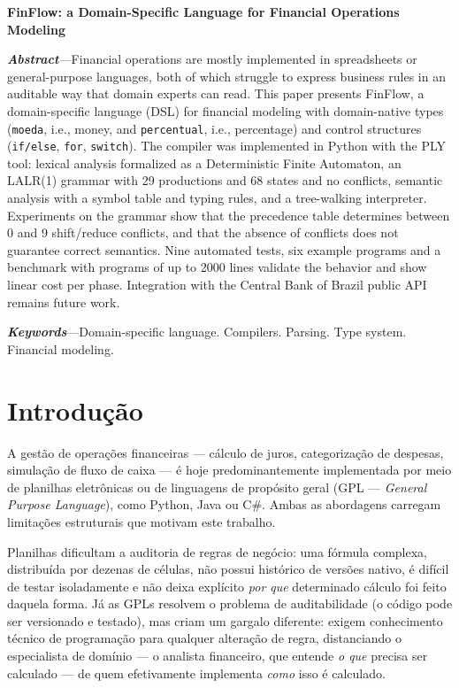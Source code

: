 \documentclass[conference]{IEEEtran}
\begin{document}
\begingroup\footnotesize\noindent\textbf{FinFlow: a Domain-Specific Language for Financial Operations Modeling}\par\smallskip
\noindent\textit{\textbf{Abstract}---}Financial operations are mostly implemented in spreadsheets or general-purpose languages, both of which struggle to express business rules in an auditable way that domain experts can read. This paper presents FinFlow, a domain-specific language (DSL) for financial modeling with domain-native types (\texttt{moeda}, i.e., money, and \texttt{percentual}, i.e., percentage) and control structures (\texttt{if/else}, \texttt{for}, \texttt{switch}). The compiler was implemented in Python with the PLY tool: lexical analysis formalized as a Deterministic Finite Automaton, an LALR(1) grammar with 29 productions and 68 states and no conflicts, semantic analysis with a symbol table and typing rules, and a tree-walking interpreter. Experiments on the grammar show that the precedence table determines between 0 and 9 shift/reduce conflicts, and that the absence of conflicts does not guarantee correct semantics. Nine automated tests, six example programs and a benchmark with programs of up to 2000 lines validate the behavior and show linear cost per phase. Integration with the Central Bank of Brazil public API remains future work.\par\smallskip
\noindent\textit{\textbf{Keywords}}---Domain-specific language. Compilers. Parsing. Type system. Financial modeling.\par
\endgroup

\section{Introdução}

A gestão de operações financeiras --- cálculo de juros, categorização de despesas, simulação de fluxo de caixa --- é hoje predominantemente implementada por meio de planilhas eletrônicas ou de linguagens de propósito geral (GPL --- \textit{General Purpose Language}), como Python, Java ou C\#. Ambas as abordagens carregam limitações estruturais que motivam este trabalho.

Planilhas dificultam a auditoria de regras de negócio: uma fórmula complexa, distribuída por dezenas de células, não possui histórico de versões nativo, é difícil de testar isoladamente e não deixa explícito \textit{por que} determinado cálculo foi feito daquela forma. Já as GPLs resolvem o problema de auditabilidade (o código pode ser versionado e testado), mas criam um gargalo diferente: exigem conhecimento técnico de programação para qualquer alteração de regra, distanciando o especialista de domínio --- o analista financeiro, que entende \textit{o que} precisa ser calculado --- de quem efetivamente implementa \textit{como} isso é calculado.
\end{document}
